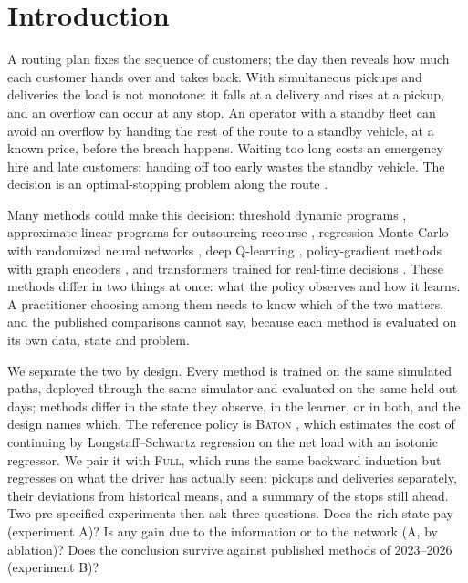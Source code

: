 \documentclass[trsc,dblanonrev]{informs4}
\newcommand{\Full}{\textsc{Full}}
\newcommand{\Baton}{\textsc{Baton}}
\begin{document}
\section{Introduction}\label{sec:intro}

A routing plan fixes the sequence of customers; the day then reveals how much
each customer hands over and takes back. With simultaneous pickups and
deliveries the load is not monotone: it falls at a delivery and rises at a
pickup, and an overflow can occur at any stop. An operator with a standby
fleet can avoid an overflow by handing the rest of the route to a standby
vehicle, at a known price, before the breach happens. Waiting too long costs an
emergency hire and late customers; handing off too early wastes the standby
vehicle. The decision is an optimal-stopping problem along the route
\citep{dang2026baton}.

Many methods could make this decision: threshold dynamic programs
\citep{yang2000stochastic, venkateshan2026note}, approximate linear programs
for outsourcing recourse \citep{zhu2026partial}, regression Monte Carlo with
randomized neural networks \citep{herrera2024optimal}, deep Q-learning
\citep{dastpak2023offline}, policy-gradient methods with graph encoders
\citep{kadyrov2025drl}, and transformers trained for real-time decisions
\citep{liu2026ortransformer}. These methods differ in two things at once: what
the policy observes and how it learns. A practitioner choosing among them needs
to know which of the two matters, and the published comparisons cannot say,
because each method is evaluated on its own data, state and problem.

We separate the two by design. Every method is trained on the same simulated
paths, deployed through the same simulator and evaluated on the same held-out
days; methods differ in the state they observe, in the learner, or in both, and
the design names which. The reference policy is \Baton{}
\citep{dang2026baton}, which estimates the cost of continuing by
Longstaff--Schwartz regression \citep{longstaff2001valuing} on the net load
with an isotonic regressor. We pair it with \Full{}, which runs the same
backward induction but regresses on what the driver has actually seen:
pickups and deliveries separately, their deviations from historical means,
and a summary of the stops still ahead. Two pre-specified experiments then ask
three questions. Does the rich state pay (experiment A)? Is any gain due to the
information or to the network (A, by ablation)? Does the conclusion survive
against published methods of 2023--2026 (experiment B)?
\end{document}
